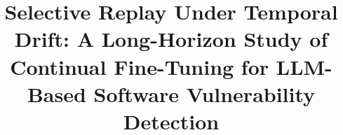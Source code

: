 \documentclass[a4paper,twoside]{article}
\begin{document}

\title{Selective Replay Under Temporal Drift: A Long-Horizon Study of Continual Fine-Tuning for LLM-Based Software Vulnerability Detection}
\end{document}
